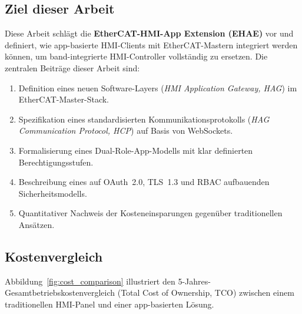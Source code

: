 ﻿\documentclass[12pt,a4paper]{article}
\begin{document}
\subsection{Ziel dieser Arbeit}

Diese Arbeit schlägt die \textbf{EtherCAT-HMI-App Extension (EHAE)} vor und definiert,
wie app-basierte HMI-Clients mit EtherCAT-Mastern integriert werden können, um
band-integrierte HMI-Controller vollständig zu ersetzen. Die zentralen Beiträge dieser
Arbeit sind:

\begin{enumerate}[leftmargin=2em]
  \item Definition eines neuen Software-Layers (\emph{HMI Application Gateway, HAG})
    im EtherCAT-Master-Stack.
  \item Spezifikation eines standardisierten Kommunikationsprotokolls (\emph{HAG
    Communication Protocol, HCP}) auf Basis von WebSockets.
  \item Formalisierung eines Dual-Role-App-Modells mit klar definierten
    Berechtigungsstufen.
  \item Beschreibung eines auf OAuth~2.0, TLS~1.3 und RBAC aufbauenden
    Sicherheitsmodells.
  \item Quantitativer Nachweis der Kosteneinsparungen gegenüber traditionellen Ansätzen.
\end{enumerate}

\subsection{Kostenvergleich}

Abbildung~\ref{fig:cost_comparison} illustriert den 5-Jahres-Gesamtbetriebskostenvergleich
(Total Cost of Ownership, TCO) zwischen einem traditionellen HMI-Panel und einer
app-basierten Lösung.
\end{document}
